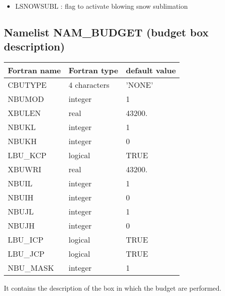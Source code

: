 \begin{itemize}
\item  LSNOWSUBL : flag to activate blowing snow sublimation
\end{itemize}



\subsection{Namelist NAM\_BUDGET (budget box description)}
\label{ss:budget}

\begin{longtable} {|p{}|p{}|p{}|}
\hline
Fortran name &  Fortran type & default value \\
\hline 
\endhead
\hline
\endfoot
CBUTYPE   &  4 characters   & 'NONE'     \\
NBUMOD    & integer & 1        \\
XBULEN    & real    & 43200.   \\
NBUKL     & integer & 1        \\
NBUKH     & integer & 0        \\
LBU\_KCP  & logical & TRUE     \\
XBUWRI    & real    & 43200.   \\
NBUIL     & integer & 1        \\
NBUIH     & integer & 0        \\
NBUJL     & integer & 1        \\
NBUJH     & integer & 0        \\
LBU\_ICP  & logical & TRUE     \\
LBU\_JCP  & logical & TRUE     \\
NBU\_MASK & integer & 1 \\
\end{longtable}

It contains the description of the box in which the budget are performed. 


